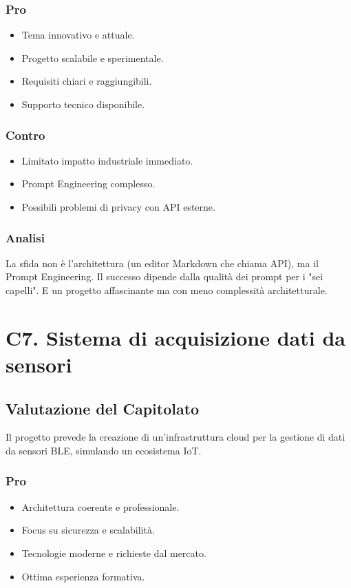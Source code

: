 \documentclass[a4paper, 11pt, oneside]{scrartcl} %
\begin{document}
\subsubsection*{Pro}
\begin{itemize}
    \item Tema innovativo e attuale.
    \item Progetto scalabile e sperimentale.
    \item Requisiti chiari e raggiungibili.
    \item Supporto tecnico disponibile.
\end{itemize}

\subsubsection*{Contro}
\begin{itemize}
    \item Limitato impatto industriale immediato.
    \item Prompt Engineering complesso.
    \item Possibili problemi di privacy con API esterne.
\end{itemize}
\subsubsection*{Analisi}
La sfida non è l'architettura (un editor Markdown che chiama API), ma il Prompt Engineering. Il successo dipende dalla qualità dei prompt per i "sei capelli". E un progetto affascinante ma con meno complessità architetturale.
\section{C7. Sistema di acquisizione dati da sensori}
\subsection*{Valutazione del Capitolato}
Il progetto prevede la creazione di un’infrastruttura cloud per la gestione di dati da sensori BLE, simulando un ecosistema IoT.

\subsubsection*{Pro}
\begin{itemize}
    \item Architettura coerente e professionale.
    \item Focus su sicurezza e scalabilità.
    \item Tecnologie moderne e richieste dal mercato.
    \item Ottima esperienza formativa.
\end{itemize}
\end{document}
